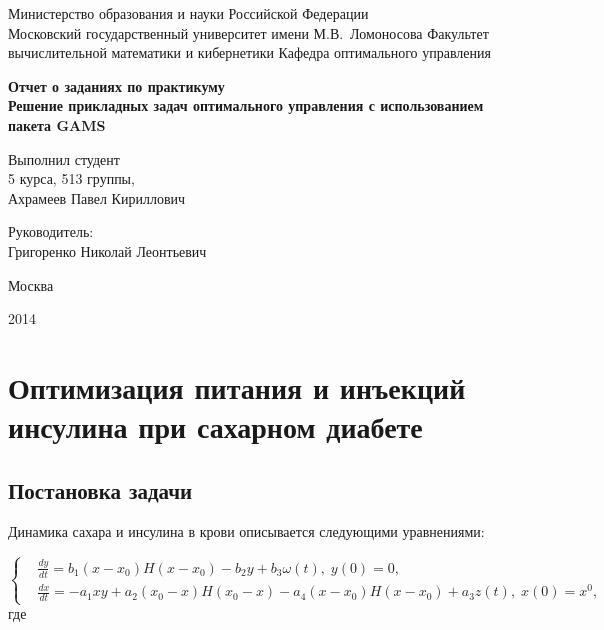 \documentclass[14pt]{article}
\begin{document}
\begin{titlepage}

\begin{centering}
Министерство образования и науки Российской Федерации\\
Московский государственный университет имени М.В.~Ломоносова
Факультет вычислительной математики и кибернетики
Кафедра оптимального управления

\vfill
\LARGE
\textbf{Отчет о заданиях по практикуму}\\
\textbf{Решение прикладных задач оптимального управления с использованием пакета GAMS}\\

\vfill

\end{centering}

\begin{flushright}

Выполнил студент\\
5 курса, 513 группы,\\
Ахрамеев Павел Кириллович\\

\vspace{0.7cm}

Руководитель:\\
Григоренко Николай Леонтьевич\\

\end{flushright}

\vfill

\centerline{Москва}
\centerline{2014}

\end{titlepage}

\pagebreak

\setcounter{page}{2}

\tableofcontents

\newpage

\section{Оптимизация питания и инъекций инсулина при сахарном диабете}
\subsection{Постановка задачи}

Динамика сахара и инсулина в крови описывается следующими уравнениями:

\begin{equation}\label{syst1}
\left\{ \begin{aligned}
& \frac{dy}{dt} = b_1(x-x_{0})H(x-x_{0}) - b_2 y+b_{3}\omega(t), \; y(0) = 0, \\
& \frac{dx}{dt} = - a_{1}xy+a_2(x_0-x)H(x_0-x)-a_4(x-x_0)H(x-x_0)+a_3 z(t), \; x(0) = x^0,
\end{aligned}\right.
\end{equation}
где
\end{document}
